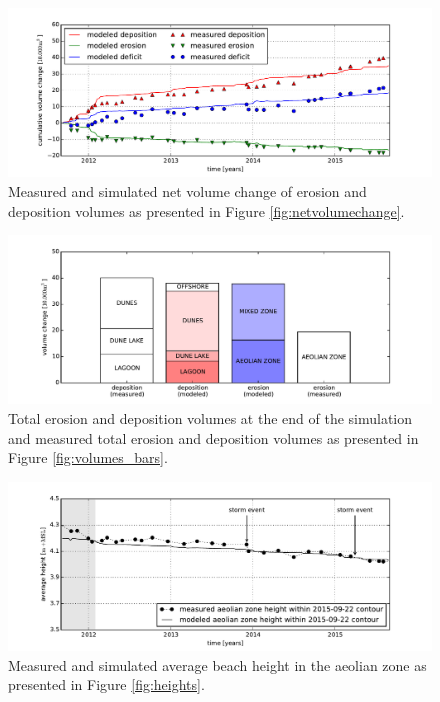\begin{figure}
  \centering
\includegraphics[width=\columnwidth]{../Figures/model_volumes_ts}
\caption{Measured and simulated net volume change of erosion and
  deposition volumes as presented in Figure
  \ref{fig:netvolumechange}.}
  \label{fig:netvolumechange_model}
\end{figure}

\begin{figure}
  \centering
  \includegraphics[width=\columnwidth]{../Figures/model_volumes}
  \caption{Total erosion and deposition volumes at the end of the
    simulation and measured total erosion and deposition volumes as
    presented in Figure \ref{fig:volumes_bars}.}
  \label{fig:volumes_bars_model}
\end{figure}

\begin{figure}
  \centering
  \includegraphics[width=\columnwidth]{../Figures/model_heights}
  \caption{Measured and simulated average beach height in the aeolian
    zone as presented in Figure \ref{fig:heights}.}
  \label{fig:heights_model}
\end{figure}

